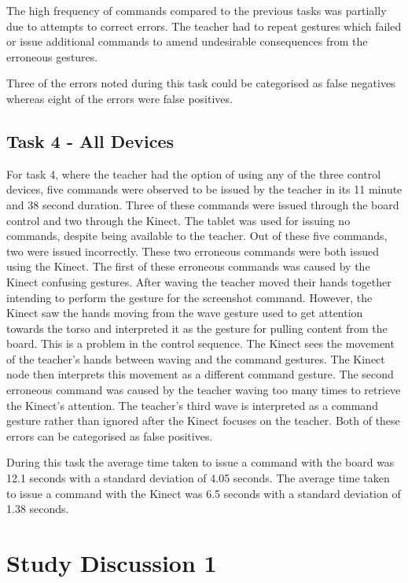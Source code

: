 \documentclass[manuscript, review, screen]{acmart}
\begin{document}
The high frequency of commands compared to the previous tasks was partially due to attempts to correct errors.
The teacher had to repeat gestures which failed or issue additional commands to amend undesirable consequences from the erroneous gestures.

Three of the errors noted during this task could be categorised as false negatives whereas eight of the errors were false positives.

\subsection{Task 4 - All Devices}
\label{sec:results:task4}  

For task 4, where the teacher had the option of using any of the three control devices, five commands were observed to be issued by the teacher in its 11 minute and 38 second duration.
Three of these commands were issued through the board control and two through the Kinect.
The tablet was used for issuing no commands, despite being available to the teacher.
Out of these five commands, two were issued incorrectly.
These two erroneous commands were both issued using the Kinect.
The first of these erroneous commands was caused by the Kinect confusing gestures.
After waving the teacher moved their hands together intending to perform the gesture for the screenshot command.
However, the Kinect saw the hands moving from the wave gesture used to get attention towards the torso and interpreted it as the gesture for pulling content from the board.
This is a problem in the control sequence.
The Kinect sees the movement of the teacher's hands between waving and the command gestures.
The Kinect node then interprets this movement as a different command gesture.
The second erroneous command was caused by the teacher waving too many times to retrieve the Kinect's attention.
The teacher's third wave is interpreted as a command gesture rather than ignored after the Kinect focuses on the teacher.
Both of these errors can be categorised as false positives.

During this task the average time taken to issue a command with the board was 12.1 seconds with a standard deviation of 4.05 seconds.
The average time taken to issue a command with the Kinect was 6.5 seconds with a standard deviation of 1.38 seconds.

\section{Study Discussion 1}
\label{sec:evaluationdiscussion1}
\end{document}
